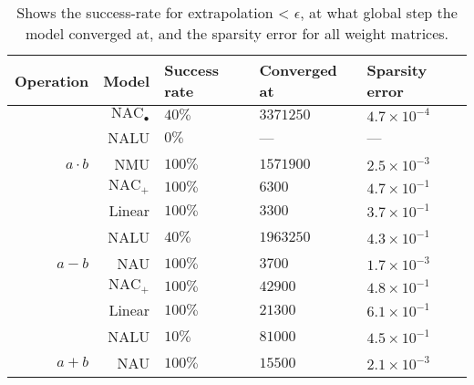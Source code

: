 \begin{table}[H]

\caption{\label{tab:function-task-static-defaults}Shows the success-rate for extrapolation < $\epsilon$, at what global step the model converged at, and the sparsity error for all weight matrices.}
\centering
\begin{tabular}{rrlll}
\toprule
Operation & Model & Success rate & Converged at & Sparsity error\\
\midrule
 & $\mathrm{NAC}_{\bullet}$ & $40\%$ & $3371250$ & $4.7 \times 10^{-4}$\\

 & NALU & $0\%$ & --- & ---\\

\multirow{-3}{*}{\raggedleft\arraybackslash ${a \cdot b}$} & NMU & $100\%$ & $1571900$ & $2.5 \times 10^{-3}$\\
\cmidrule{1-5}
 & $\mathrm{NAC}_{+}$ & $100\%$ & $6300$ & $4.7 \times 10^{-1}$\\

 & Linear & $100\%$ & $3300$ & $3.7 \times 10^{-1}$\\

 & NALU & $40\%$ & $1963250$ & $4.3 \times 10^{-1}$\\

\multirow{-4}{*}{\raggedleft\arraybackslash $a - b$} & NAU & $100\%$ & $3700$ & $1.7 \times 10^{-3}$\\
\cmidrule{1-5}
 & $\mathrm{NAC}_{+}$ & $100\%$ & $42900$ & $4.8 \times 10^{-1}$\\

 & Linear & $100\%$ & $21300$ & $6.1 \times 10^{-1}$\\

 & NALU & $10\%$ & $81000$ & $4.5 \times 10^{-1}$\\

\multirow{-4}{*}{\raggedleft\arraybackslash $a + b$} & NAU & $100\%$ & $15500$ & $2.1 \times 10^{-3}$\\
\bottomrule
\end{tabular}
\end{table}
